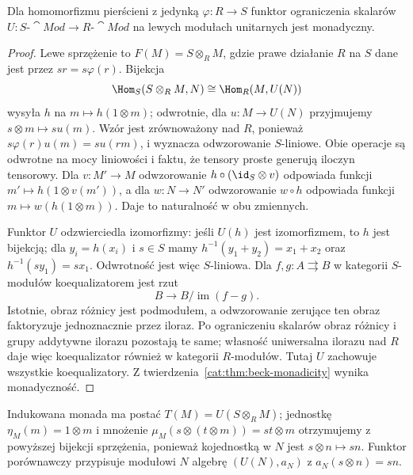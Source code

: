 \begin{stwierdzenie}\label{cat:prop:beck-restriction}
Dla homomorfizmu pierścieni z jedynką $\varphi:R\to S$ funktor ograniczenia skalarów $U:S\text{-}\cat{Mod}\to R\text{-}\cat{Mod}$ na lewych modułach unitarnych jest monadyczny.
\end{stwierdzenie}
\begin{proof}
Lewe sprzężenie to $F(M)=S\otimes_R M$, gdzie prawe działanie $R$ na $S$ dane jest przez $sr=s\varphi(r)$. Bijekcja
\[
 \Hom_S(S\otimes_R M,N)\cong\Hom_R(M,U(N))
\]
wysyła $h$ na $m\mapsto h(1\otimes m)$; odwrotnie, dla $u:M\to U(N)$ przyjmujemy $s\otimes m\mapsto su(m)$. Wzór jest zrównoważony nad $R$, ponieważ $s\varphi(r)u(m)=su(rm)$, i wyznacza odwzorowanie $S$-liniowe. Obie operacje są odwrotne na mocy liniowości i faktu, że tensory proste generują iloczyn tensorowy. Dla $v:M'\to M$ odwzorowanie $h\circ(\id_S\otimes v)$ odpowiada funkcji $m'\mapsto h(1\otimes v(m'))$, a dla $w:N\to N'$ odwzorowanie $w\circ h$ odpowiada funkcji $m\mapsto w(h(1\otimes m))$. Daje to naturalność w obu zmiennych.

Funktor $U$ odzwierciedla izomorfizmy: jeśli $U(h)$ jest izomorfizmem, to $h$ jest bijekcją; dla $y_i=h(x_i)$ i $s\in S$ mamy $h^{-1}(y_1+y_2)=x_1+x_2$ oraz $h^{-1}(sy_1)=sx_1$. Odwrotność jest więc $S$-liniowa. Dla $f,g:A\rightrightarrows B$ w kategorii $S$-modułów koequalizatorem jest rzut
\[
 B\longrightarrow B/\operatorname{im}(f-g).
\]
Istotnie, obraz różnicy jest podmodułem, a odwzorowanie zerujące ten obraz faktoryzuje jednoznacznie przez iloraz. Po ograniczeniu skalarów obraz różnicy i grupy addytywne ilorazu pozostają te same; własność uniwersalna ilorazu nad $R$ daje więc koequalizator również w kategorii $R$-modułów. Tutaj $U$ zachowuje wszystkie koequalizatory. Z twierdzenia~\ref{cat:thm:beck-monadicity} wynika monadyczność.
\end{proof}

Indukowana monada ma postać $T(M)=U(S\otimes_R M)$; jednostkę $\eta_M(m)=1\otimes m$ i mnożenie $\mu_M(s\otimes(t\otimes m))=st\otimes m$ otrzymujemy z powyższej bijekcji sprzężenia, ponieważ kojednostką w $N$ jest $s\otimes n\mapsto sn$. Funktor porównawczy przypisuje modułowi $N$ algebrę $(U(N),a_N)$ z $a_N(s\otimes n)=sn$.

